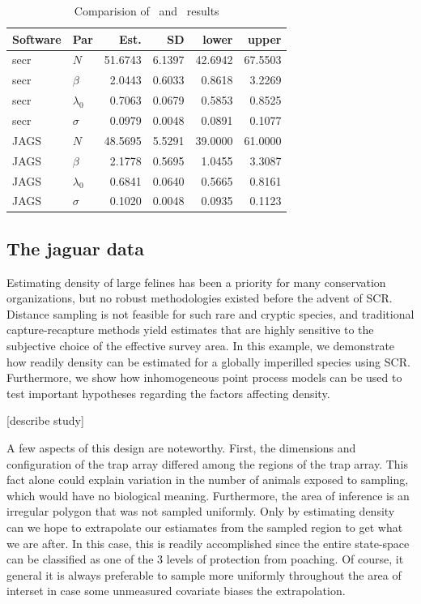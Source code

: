 \begin{table}
\centering
\caption{Comparision of \jags~and \secr~results}
\begin{tabular}{llrrrr}
\hline
Software & Par & Est. & SD & lower & upper \\
\hline
 secr & $N$ & 51.6743 & 6.1397 & 42.6942 & 67.5503 \\
 secr & $\beta$ &  2.0443 & 0.6033 &  0.8618 &  3.2269 \\
 secr & $\lambda_0$ &  0.7063 & 0.0679 &  0.5853 &  0.8525 \\
 secr & $\sigma$ &  0.0979 & 0.0048 &  0.0891 &  0.1077 \\
 JAGS & $N$ & 48.5695 & 5.5291 & 39.0000 & 61.0000 \\
 JAGS & $\beta$ &  2.1778 & 0.5695 &  1.0455 &  3.3087 \\
 JAGS & $\lambda_0$ &  0.6841 & 0.0640 &  0.5665 &  0.8161 \\
 JAGS & $\sigma$ &  0.1020 & 0.0048 &  0.0935 &  0.1123 \\
\hline
\end{tabular}
\label{ch9:tab:secrYjags}
\end{table}



\subsection{The jaguar data}

Estimating density of large felines has been a priority for many
conservation organizations, but no robust methodologies existed before
the advent of SCR. Distance sampling is not feasible for such rare and
cryptic species, and traditional capture-recapture methods yield
estimates that are highly sensitive to the subjective choice of the
effective survey area. In this example, we
demonstrate how readily density can be estimated for a
globally imperilled species using SCR. Furthermore, we show how
inhomogeneous point process models can be used to test important
hypotheses regarding the factors affecting density.

[describe study]

A few aspects of this design are noteworthy. First, the dimensions and
configuration of the trap array differed among the regions of the trap
array. This fact alone could explain variation in the number of
animals exposed to sampling, which would have no biological
meaning. Furthermore, the area of inference is an irregular polygon
that was not sampled uniformly. Only by estimating density can we hope
to extrapolate our estiamates from the sampled region to get what we
are after. In this case, this is readily accomplished since the entire
state-space can be classified as one of the 3 levels of protection
from poaching. Of course, it general it is always preferable to sample
more uniformly throughout the area of interset in case some unmeasured
covariate biases the extrapolation.

